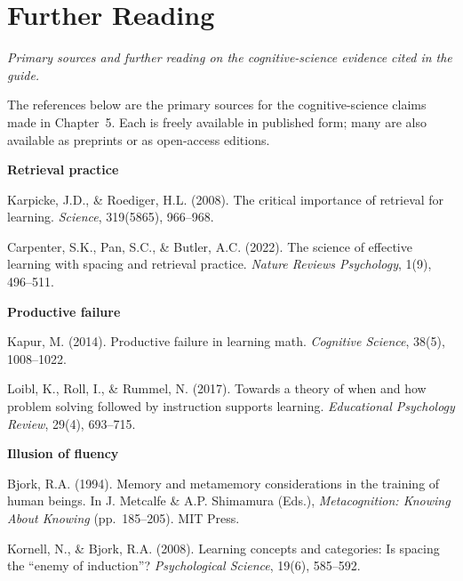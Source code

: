 \documentclass[11pt]{book}
\begin{document}
\chapter{Further Reading}
\label{app:further-reading}

\noindent \emph{Primary sources and further reading on the cognitive-science evidence cited in the guide.}

\medskip

The references below are the primary sources for the cognitive-science claims made in Chapter~5. Each is freely available in published form; many are also available as preprints or as open-access editions.

\medskip

\noindent \textbf{Retrieval practice}

\medskip

Karpicke, J.D., \& Roediger, H.L. (2008). The critical importance of retrieval for learning. \emph{Science}, 319(5865), 966--968.

\medskip

Carpenter, S.K., Pan, S.C., \& Butler, A.C. (2022). The science of effective learning with spacing and retrieval practice. \emph{Nature Reviews Psychology}, 1(9), 496--511.

\medskip

\noindent \textbf{Productive failure}

\medskip

Kapur, M. (2014). Productive failure in learning math. \emph{Cognitive Science}, 38(5), 1008--1022.

\medskip

Loibl, K., Roll, I., \& Rummel, N. (2017). Towards a theory of when and how problem solving followed by instruction supports learning. \emph{Educational Psychology Review}, 29(4), 693--715.

\medskip

\noindent \textbf{Illusion of fluency}

\medskip

Bjork, R.A. (1994). Memory and metamemory considerations in the training of human beings. In J. Metcalfe \& A.P. Shimamura (Eds.), \emph{Metacognition: Knowing About Knowing} (pp.\ 185--205). MIT Press.

\medskip

Kornell, N., \& Bjork, R.A. (2008). Learning concepts and categories: Is spacing the ``enemy of induction''? \emph{Psychological Science}, 19(6), 585--592.
\end{document}
